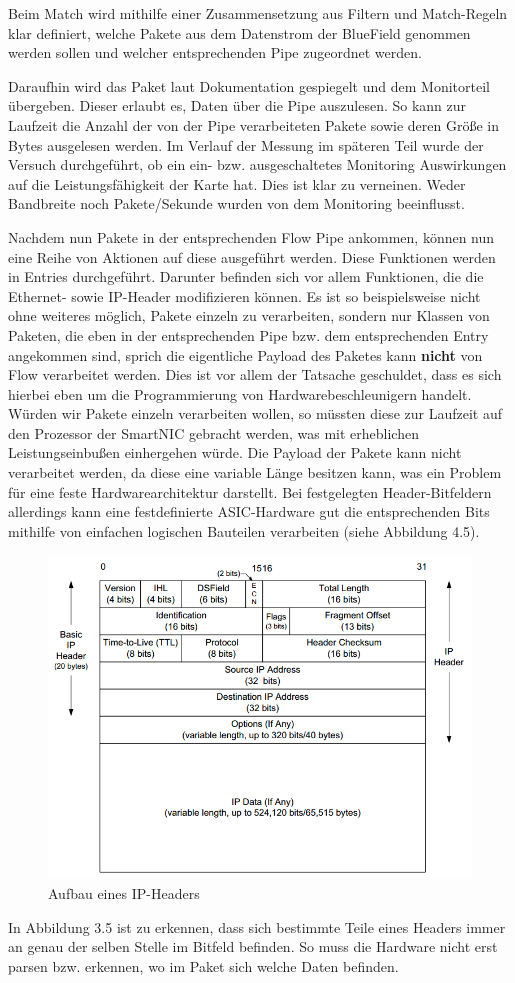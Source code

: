 Beim Match wird mithilfe einer Zusammensetzung aus Filtern und Match-Regeln klar definiert, welche Pakete aus dem Datenstrom der BlueField genommen werden sollen und welcher entsprechenden Pipe zugeordnet werden. 

Daraufhin wird das Paket laut Dokumentation gespiegelt und dem Monitorteil übergeben. Dieser erlaubt es, Daten über die Pipe auszulesen. So kann zur Laufzeit die Anzahl der von der Pipe verarbeiteten Pakete sowie deren Größe in Bytes ausgelesen werden. Im Verlauf der Messung im späteren Teil wurde der Versuch durchgeführt, ob ein ein- bzw. ausgeschaltetes Monitoring Auswirkungen auf die Leistungsfähigkeit der Karte hat. Dies ist klar zu verneinen. Weder Bandbreite noch Pakete/Sekunde wurden von dem Monitoring beeinflusst.

Nachdem nun Pakete in der entsprechenden Flow Pipe ankommen, können nun eine Reihe von Aktionen auf diese ausgeführt werden. Diese Funktionen werden in Entries durchgeführt. Darunter befinden sich vor allem Funktionen, die die Ethernet- sowie IP-Header modifizieren können. Es ist so beispielsweise nicht ohne weiteres möglich, Pakete einzeln zu verarbeiten, sondern nur Klassen von Paketen, die eben in der entsprechenden Pipe bzw. dem entsprechenden Entry angekommen sind, sprich die eigentliche Payload des Paketes kann \textbf{nicht} von Flow verarbeitet werden. Dies ist vor allem der Tatsache geschuldet, dass es sich hierbei eben um die Programmierung von Hardwarebeschleunigern handelt. Würden wir Pakete einzeln verarbeiten wollen, so müssten diese zur Laufzeit auf den Prozessor der SmartNIC gebracht werden, was mit erheblichen Leistungseinbußen einhergehen würde.
Die Payload der Pakete kann nicht verarbeitet werden, da diese eine variable Länge besitzen kann, was ein Problem für eine feste Hardwarearchitektur darstellt. Bei festgelegten Header-Bitfeldern allerdings kann eine festdefinierte ASIC-Hardware gut die entsprechenden Bits mithilfe von einfachen logischen Bauteilen verarbeiten (siehe Abbildung 4.5).  \cite{nvidia_doca_flow_v1_2} 
\begin{figure}
    \centering
    \includegraphics[width=0.8\linewidth]{images/figure_5-1.png}
    \caption{Aufbau eines IP-Headers}
    \label{fig:enter-label}
\end{figure}
In Abbildung 3.5 ist zu erkennen, dass sich bestimmte Teile eines Headers immer an genau der selben Stelle im Bitfeld befinden. So muss die Hardware nicht erst parsen bzw. erkennen, wo im Paket sich welche Daten befinden.

